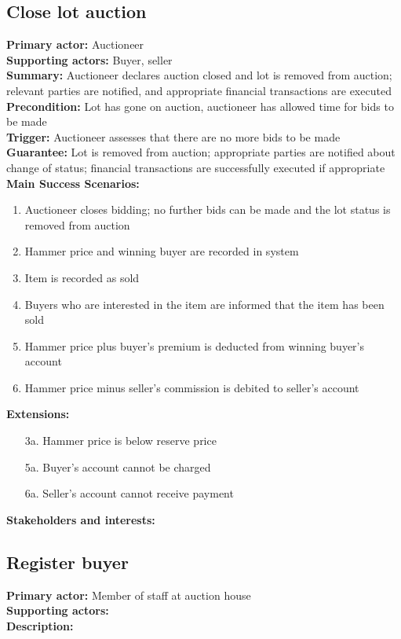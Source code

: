 \documentclass[titlepage, 12pt]{extarticle}
\begin{document}
\subsection{Close lot auction}
{\bf Primary actor: } Auctioneer 
\\{\bf Supporting actors: } Buyer, seller
\\{\bf Summary: } Auctioneer declares auction closed and lot is removed from auction; relevant parties are notified, and appropriate financial transactions are executed
\\{\bf Precondition: } Lot has gone on auction, auctioneer has allowed time for bids to be made
\\{\bf Trigger: } Auctioneer assesses that there are no more bids to be made
\\{\bf Guarantee: } Lot is removed from auction; appropriate parties are notified about change of status; financial transactions are successfully executed if appropriate
\\{\bf Main Success Scenarios: }
\begin{enumerate}
\item Auctioneer closes bidding; no further bids can be made and the lot status is removed from auction
\item Hammer price and winning buyer are recorded in system
\item Item is recorded as sold
\item Buyers who are interested in the item are informed that the item has been sold
\item Hammer price plus buyer's premium is deducted from winning buyer's account
\item Hammer price minus seller's commission is debited to seller's account
\end{enumerate}
{\bf Extensions: }
\begin{itemize}
\item [3a.] Hammer price is below reserve price
\item [5a.] Buyer's account cannot be charged 
\item [6a.] Seller's account cannot receive payment
\end{itemize}
{\bf Stakeholders and interests: }
\subsection{Register buyer}
{\bf Primary actor: } Member of staff at auction house
\\{\bf Supporting actors: }
\\{\bf Description: }
\end{document}
